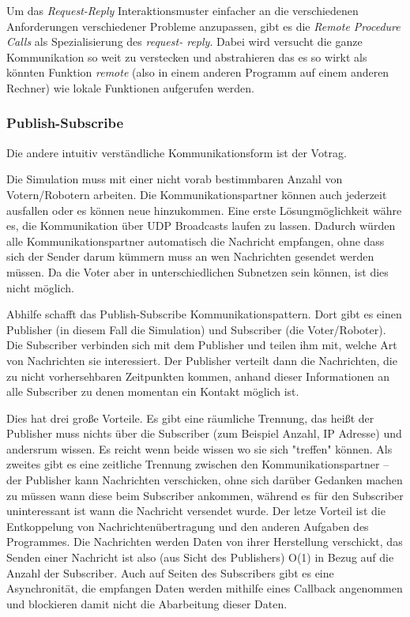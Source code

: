Um das \textit{Request-Reply} Interaktionsmuster einfacher an die verschiedenen Anforderungen verschiedener
Probleme anzupassen, gibt es die \textit{Remote Procedure Calls} als Spezialisierung des \textit{request-
reply}. Dabei wird versucht die ganze Kommunikation so weit zu verstecken und abstrahieren das es so wirkt
als k{\"{o}}nnten Funktion \textit{remote} (also in einem anderen Programm auf einem anderen Rechner) wie
lokale Funktionen aufgerufen werden.

\subsubsection{Publish-Subscribe}
Die andere intuitiv verst{\"{a}}ndliche Kommunikationsform ist der Votrag.

Die Simulation muss mit einer nicht vorab bestimmbaren Anzahl von Votern/Robotern arbeiten. Die Kommunikationspartner k{\"{o}}nnen auch jederzeit ausfallen oder es k{\"{o}}nnen neue hinzukommen.
Eine erste L{\"{o}}sungm{\"{o}}glichkeit w{\"{a}}hre es, die Kommunikation {\"{u}}ber UDP Broadcasts
laufen zu lassen. Dadurch w{\"{u}}rden alle Kommunikationspartner automatisch die Nachricht empfangen, ohne
dass sich der Sender darum k{\"{u}}mmern muss an wen Nachrichten gesendet werden m{\"{u}}ssen. Da die
Voter aber in unterschiedlichen Subnetzen sein k{\"{o}}nnen, ist dies nicht m{\"{o}}glich.

Abhilfe schafft das Publish-Subscribe Kommunikationspattern\cite{pubsub}. Dort gibt es einen Publisher (in
diesem Fall die Simulation) und Subscriber (die Voter/Roboter). Die Subscriber verbinden sich mit dem
Publisher und teilen ihm mit, welche Art von Nachrichten sie interessiert. Der Publisher verteilt dann die
Nachrichten, die zu nicht vorhersehbaren Zeitpunkten kommen, anhand dieser Informationen an alle Subscriber zu denen momentan ein Kontakt m{\"{o}}glich ist.

Dies hat drei gro{\ss}e Vorteile. Es gibt eine r{\"{a}}umliche Trennung, das hei{\ss}t der Publisher muss
nichts {\"{u}}ber die Subscriber (zum Beispiel Anzahl, IP Adresse) und andersrum wissen. Es reicht
wenn beide wissen wo sie sich "treffen" k{\"{o}}nnen. Als zweites gibt es eine zeitliche Trennung zwischen
den Kommunikationspartner -- der Publisher kann Nachrichten verschicken, ohne sich dar{\"{u}}ber Gedanken
machen zu m{\"{u}}ssen wann diese beim Subscriber ankommen, w{\"{a}}hrend es f{\"{u}}r den Subscriber
uninteressant ist wann die Nachricht versendet wurde. Der letze Vorteil ist die Entkoppelung von
Nachrichten{\"{u}}bertragung und den anderen Aufgaben des Programmes. Die Nachrichten werden Daten
von ihrer Herstellung verschickt, das Senden einer Nachricht ist also (aus Sicht des
Publishers) O(1) in Bezug auf die Anzahl der Subscriber. Auch auf Seiten des Subscribers gibt es eine
Asynchronit{\"{a}}t, die empfangen Daten werden mithilfe eines Callback angenommen und blockieren damit
nicht die Abarbeitung dieser Daten.

